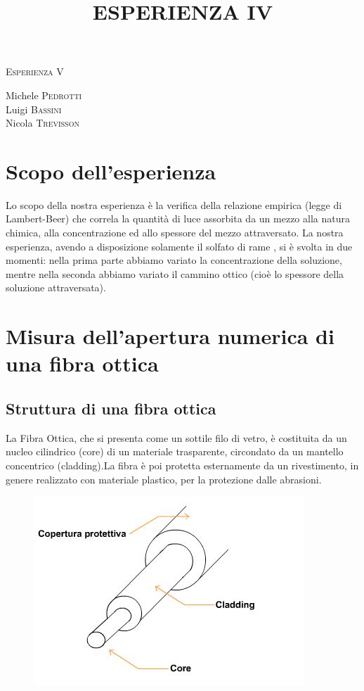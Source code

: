 \documentclass[a4paper,11pt]{article}
\begin{document}
\begin{center}



\textsc{\Huge Esperienza V}\\[0.5cm]



\large
\title{ESPERIENZA IV}

Michele \textsc{Pedrotti}\\
Luigi \textsc{Bassini}\\
Nicola \textsc{Trevisson}\\


\end{center}
\vspace{0.1 cm}
\section{Scopo dell'esperienza}
 Lo scopo della nostra esperienza è la verifica della relazione empirica (legge di Lambert-Beer) che correla la quantità di luce assorbita da un mezzo alla natura chimica, alla concentrazione ed allo spessore del mezzo attraversato. La nostra esperienza, avendo a disposizione solamente il solfato di rame , si è svolta in due momenti: nella prima parte abbiamo variato la concentrazione della soluzione, mentre nella seconda abbiamo variato il cammino ottico (cioè lo spessore della soluzione attraversata).

\section{Misura dell'apertura numerica di una fibra ottica}
\subsection{Struttura di una fibra ottica}
La Fibra Ottica, che si presenta come un sottile filo di vetro, è costituita da un nucleo cilindrico (core) di un materiale trasparente, circondato da un mantello concentrico (cladding).La fibra è poi protetta esternamente da un rivestimento, in genere realizzato con materiale plastico, per la protezione dalle abrasioni.

 \begin{center} 
\begin{figure}[htpd]
\hspace{90 pt}
\includegraphics[scale=0.90]{fibre_ottiche.jpg}


\end{figure}
\end{center}
\end{document}

